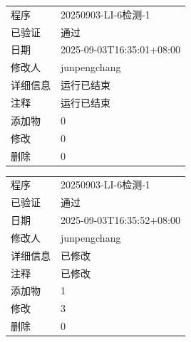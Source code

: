 \documentclass[UTF8,10pt,a4paper,fontset=fandol]{ctexart}
\newcommand{\fieldvalue}[1]{#1}
\begin{document}
\begin{tabular}{@{}p{2.5cm}p{12cm}@{}}
程序 &
\fieldvalue{20250903-LI-6检测-1} \\

已验证 &
\fieldvalue{通过} \\

日期 &
\fieldvalue{2025-09-03T16:35:01+08:00} \\

修改人 &
\fieldvalue{junpengchang} \\

详细信息 &
\fieldvalue{运行已结束} \\

注释 &
\fieldvalue{运行已结束} \\

添加物 &
\fieldvalue{0} \\

修改 &
\fieldvalue{0} \\

删除 &
\fieldvalue{0} \\
\end{tabular}

\vspace{0.8em}

\begin{tabular}{@{}p{2.5cm}p{12cm}@{}}
程序 &
\fieldvalue{20250903-LI-6检测-1} \\

已验证 &
\fieldvalue{通过} \\

日期 &
\fieldvalue{2025-09-03T16:35:52+08:00} \\

修改人 &
\fieldvalue{junpengchang} \\

详细信息 &
\fieldvalue{已修改} \\

注释 &
\fieldvalue{已修改} \\

添加物 &
\fieldvalue{1} \\

修改 &
\fieldvalue{3} \\

删除 &
\fieldvalue{0} \\
\end{tabular}
\normalsize
\end{document}
